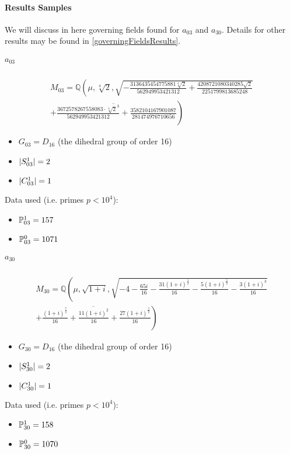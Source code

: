 \paragraph{Results Samples}
We will discuss in here governing fields found for $a_{03}$ and $a_{30}$.
Details for other results may be found in \ref{governingFieldsResults}.

\subparagraph{$a_{03}$}
\begin{multline*}
	M_{03} = \mathbb{Q}\left(\mu, \sqrt[4]{2}, 
	\sqrt{
		- \frac{3136435454775881 \sqrt[4]{2}}{562949953421312} 
		+ \frac{4208721080340285 \sqrt{2}}{2251799813685248} 
	}\right. \\
	\left. \overline{ 
		+ \frac{3672578267558083 \cdot \sqrt[4]{2}^3}{562949953421312} 
		+ \frac{3582104167901087}{281474976710656}
	}\right)
\end{multline*}
\setlength{\columnsep}{0.85cm}
\begin{multicols}{2}
	\begin{itemize}
		\item $G_{03} = D_{16}$ (the dihedral group of order 16)
		\item $| S_{03}^1 | = 2$
		\item $| C_{03}^1 | = 1$
	\end{itemize}
	Data used (i.e. primes $p<10^4$):
	\begin{itemize}
		\item $\mathbb{P}_{03}^1 = 157$
		\item $\mathbb{P}_{03}^0 = 1071$
	\end{itemize}
\end{multicols}

\subparagraph{$a_{30}$}
\begin{multline*}
	M_{30} = \mathbb{Q}\left(\mu, \sqrt{1+i}, 
	\sqrt{
		-4 
		- \frac{65 i}{16} 
		- \frac{31 \left(1 + i\right)^{\frac{1}{2}}}{16} 
		- \frac{5 \left(1 + i\right)^{\frac{5}{2}}}{16} 
		- \frac{3 \left(1 + i\right)^{3}}{16} 
	}\right. \\
	\left. \overline{
		+ \frac{\left(1 + i\right)^{\frac{7}{2}}}{16} 
		+ \frac{11 \left(1 + i\right)^{2}}{16} 
		+ \frac{27 \left(1 + i\right)^{\frac{3}{2}}}{16}
	}\right)
\end{multline*}
\begin{multicols}{2}
	\begin{itemize}
		\item $G_{30} = D_{16}$ (the dihedral group of order 16)
		\item $| S_{30}^1 | = 2$
		\item $| C_{30}^1 | = 1$
	\end{itemize}
	Data used (i.e. primes $p<10^4$):
	\begin{itemize}
		\item $\mathbb{P}_{30}^1 = 158$
		\item $\mathbb{P}_{30}^0 = 1070$
	\end{itemize}
\end{multicols}


